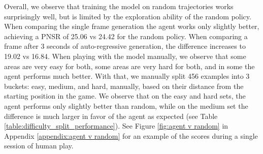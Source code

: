 \documentclass{article} %
\begin{document}
Overall, we observe that training the model on random trajectories works surprisingly well, but is limited by the exploration ability of the random policy.
When comparing the single frame generation the agent works only slightly better, achieving a PNSR of 25.06 vs 24.42 for the random policy.
When comparing a frame after 3 seconds of auto-regressive generation, the difference increases to 19.02 vs 16.84.
When playing with the model manually, we observe that some areas are very easy for both, some areas are very hard for both, and in some the agent performs much better. With that, we manually split 456 examples into 3 buckets: easy, medium, and hard, manually, based on their distance from the starting position in the game.
We observe that on the easy and hard sets, the agent performs only slightly better than random, while on the medium set the difference is much larger in favor of the agent as expected (see Table \ref{table:difficulty_split_performance}). See Figure \ref{fig:agent v random} in Appendix \ref{appendix:agent v random} for an example of the scores during a single session of human play.

\begin{table}[t]
\caption{\textbf{Performance on Different Difficulty Levels.} We compare the performance of models trained using Agent-generated and Random-generated data across easy, medium, and hard splits of the dataset. Easy and medium have 112 items, hard has 232 items. Metrics are computed for each trajectory on a single frame after 3 seconds.
\label{table:difficulty_split_performance}}
\centering
\vspace{0.05in}
\end{table}
\end{document}
